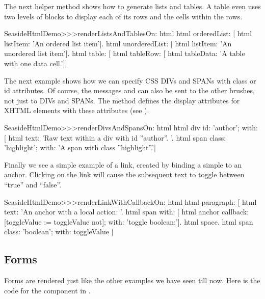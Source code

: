 \documentclass[a4paper,10pt,twoside]{book}
\begin{document}
The next helper method shows how to generate lists and tables.
A table even uses two levels of blocks to display each of its rows and the cells within the rows.

\begin{code}{}
SeasideHtmlDemo>>>renderListsAndTablesOn: html 
	html orderedList: [
		html listItem: 'An ordered list item'].
	html unorderedList: [
		html listItem: 'An unordered list item'].
	html table: [
		html tableRow: [
			html tableData: 'A table with one data cell.']]
\end{code}

The next example shows how we can specify CSS DIVs and SPANs with class or id attributes.
Of course, the messages  and  can also be sent to the other brushes, not just to DIVs and SPANs.
The method  defines the display attributes for XHTML elements with these attributes (see ).

\begin{code}{}
SeasideHtmlDemo>>>renderDivsAndSpansOn: html 
	html div
		id: 'author';
		with: [
			html text: 'Raw text within a div with id ''author''. '.
			html span
				class: 'highlight';
				with: 'A span with class ''highlight''.']
\end{code}

Finally we see a simple example of a link, created by binding a simple  to an anchor.
Clicking on the link will cause the subsequent text to toggle between ``true'' and ``false''.

\begin{code}{}
SeasideHtmlDemo>>>renderLinkWithCallbackOn: html 
	html paragraph: [
		html text: 'An anchor with a local action: '.
		html span with: [
			html anchor
				callback: [toggleValue := toggleValue not];
				with: 'toggle boolean:'].
		html space.
		html span
			class: 'boolean';
			with: toggleValue ]
\end{code}


\subsection{Forms}

Forms are rendered just like the other examples we have seen till now.
Here is the code for the  component in .
\end{document}
